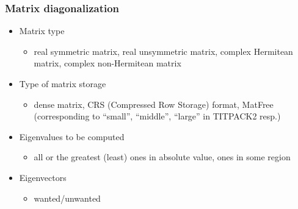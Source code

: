 \begin{frame}
  \frametitle{Matrix diagonalization}
  \begin{itemize}
  \item Matrix type
    \begin{itemize}
    \item real symmetric matrix, real unsymmetric matrix, complex Hermitean matrix, complex non-Hermitean matrix
    \end{itemize}
  \item Type of matrix storage
    \begin{itemize}
      \item dense matrix, CRS (Compressed Row Storage) format, MatFree\\
            (corresponding to ``small'', ``middle'', ``large'' in TITPACK2 resp.)
    \end{itemize}
  \item Eigenvalues to be computed
    \begin{itemize}
      \item all or the greatest (least) ones in absolute value, ones in some region
    \end{itemize}
  \item Eigenvectors
    \begin{itemize}
      \item wanted/unwanted
    \end{itemize}
  \end{itemize}
\end{frame}

